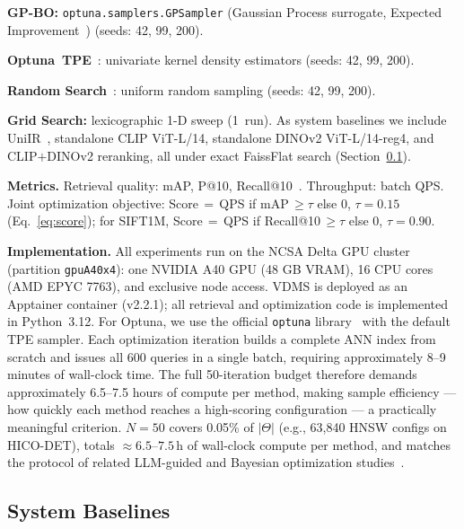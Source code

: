 \documentclass[sigconf, nonacm]{acmart}
\theoremstyle{definition}
\begin{document}
\noindent\textbf{GP-BO:} \texttt{optuna.samplers.\allowbreak GPSampler} (Gaussian Process surrogate, Expected Improvement~\cite{snoek2012bayesian}) (seeds: 42, 99, 200).

\noindent\textbf{Optuna~TPE}~\cite{akiba2019optuna}: univariate kernel density estimators (seeds: 42, 99, 200).

\noindent\textbf{Random Search}~\cite{bergstra2012random}: uniform random sampling (seeds: 42, 99, 200).

\noindent\textbf{Grid Search:} lexicographic 1-D sweep (1~run).
As system baselines we include UniIR~\cite{wei2024uniir}, standalone CLIP
ViT-L/14, standalone DINOv2 ViT-L/14-reg4, and CLIP$+$DINOv2 reranking,
all under exact FaissFlat search (Section~\ref{sec:baselines}).

\noindent\textbf{Metrics.}\label{sec:metrics}
Retrieval quality: mAP, P@10, Recall@10~\cite{manning2008ir}.
Throughput: batch QPS.
Joint optimization objective: Score\,$=$\,QPS if mAP\,$\geq\tau$ else $0$,
$\tau{=}0.15$ (Eq.~\eqref{eq:score});
for SIFT1M, Score\,$=$\,QPS if Recall@10\,$\geq\tau$ else $0$, $\tau{=}0.90$.

\noindent\textbf{Implementation.}
All experiments run on the NCSA Delta GPU cluster (partition \texttt{gpuA40x4}): one
NVIDIA A40 GPU (48 GB VRAM), 16 CPU cores (AMD EPYC 7763), and exclusive node access.
VDMS is deployed as an Apptainer container (v2.2.1); all retrieval and optimization code
is implemented in Python~3.12.
For Optuna, we use the official \texttt{optuna} library~\cite{akiba2019optuna} with
the default TPE sampler.
Each optimization iteration builds a complete ANN index from scratch and issues all
600 queries in a single batch, requiring approximately 8--9 minutes of wall-clock time.
The full 50-iteration budget therefore demands approximately 6.5--7.5 hours of compute
per method, making sample efficiency --- how quickly each method reaches a high-scoring
configuration --- a practically meaningful criterion.
$N{=}50$ covers 0.05\% of $|\Theta|$ (e.g., 63{,}840 HNSW configs on HICO-DET), totals ${\approx}6.5$--$7.5$\,h of wall-clock compute per method, and matches the protocol of related LLM-guided and Bayesian optimization studies~\cite{lao2024gpttuner,yang2024opro}.

\subsection{System Baselines}
\label{sec:baselines}
\end{document}
